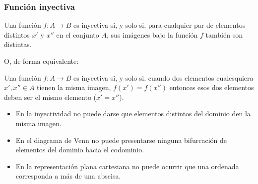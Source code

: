 \subsubsection{Función inyectiva}
\vspace{1em}
\begin{fmd-definition}
	Una función $f: A \rightarrow B$ es inyectiva si, y solo si, para cualquier par de elementos distintos $x'$ y $x''$ en el conjunto $A$, sus imágenes bajo la función $f$ también son distintas.
\end{fmd-definition}
\vspace{1mm}

O, de forma equivalente:

Una función $f: A \rightarrow B$ es inyectiva si, y solo si, cuando dos elementos cualesquiera $x', x'' \in A$ tienen la misma imagen, $f(x') = f(x'')$ entonces esos dos elementos deben ser el mismo elemento ($x' = x''$).

\begin{itemize}
	\item En la inyectividad no puede darse que elementos distintos del dominio den la misma
	imagen.
	\item En el diagrama de Venn no puede presentarse ninguna bifurcación de elementos del 
	dominio hacia el codominio.
	\item En la representación plana cartesiana no puede ocurrir que una ordenada
	corresponda a más de una abscisa.
\end{itemize}


